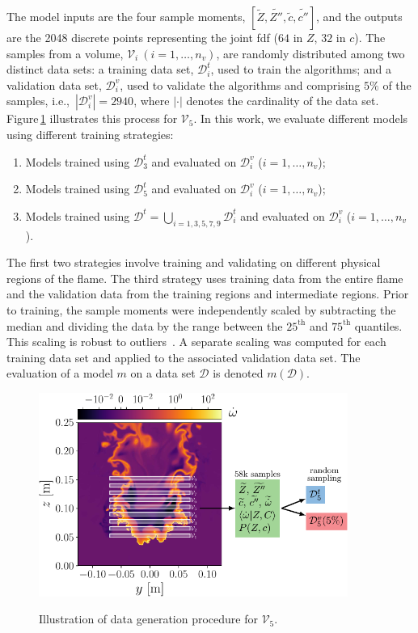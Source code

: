 \documentclass[review]{elsarticle}
\newcommand{\wt}[1]{\widetilde{#1}}
\begin{document}
The model inputs are the four sample moments,
$\left[ \wt{Z}, \wt{Z''}, \wt{c}, \wt{c''} \right]$, and the outputs
are the 2048 discrete points representing the joint \gls{fdf} ($64$ in
$Z$, $32$ in $c$). The samples from a volume,
$\mathcal{V}_i~(i=1,\dots, n_v)$, are randomly distributed among two
distinct data sets: a training data set, $\mathcal{D}_i^t$, used to
train the algorithms; and a validation data set, $\mathcal{D}_i^v$,
used to validate the algorithms and comprising $5\%$ of the samples,
i.e.,\ $|\mathcal{D}_i^v| = 2940$, where $|\cdot|$ denotes the
cardinality of the data set. Figure\,\ref{fig:gen_data} illustrates
this process for $\mathcal{V}_5$. In this work, we evaluate different
models using different training strategies:
\begin{enumerate}
\item Models trained using $\mathcal{D}_3^t$ and evaluated on $\mathcal{D}_i^v$ ($i=1, \dots, n_v$);
\item Models trained using $\mathcal{D}_5^t$ and evaluated on $\mathcal{D}_i^v$ ($i=1, \dots, n_v$);
\item Models trained using $\mathcal{D}^t = \bigcup\limits_{i=1, 3, 5, 7, 9} \mathcal{D}_i^t$ and evaluated on $\mathcal{D}_i^v$ ($i=1, \dots, n_v$).
\end{enumerate}
The first two strategies involve training and validating on different
physical regions of the flame. The third strategy uses training data
from the entire flame and the validation data from the training
regions and intermediate regions. Prior to training, the sample
moments were independently scaled by subtracting the median and
dividing the data by the range between the $25^\text{th}$ and
$75^\text{th}$ quantiles. This scaling is robust to
outliers~\cite{Pedregosa2011}. A separate scaling was computed for
each training data set and applied to the associated validation data
set. The evaluation of a model $m$ on a data set $\mathcal{D}$ is
denoted $m(\mathcal{D})$.

\begin{figure}[!tbp]%
  \centering%
  \includegraphics[width=0.9\textwidth]{./figs/gen_data.pdf}\\%
  \caption{Illustration of data generation procedure for $\mathcal{V}_5$.}\label{fig:gen_data}%
\end{figure}%
\end{document}
